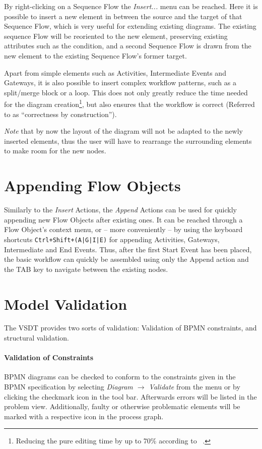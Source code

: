 By right-clicking on a Sequence Flow the \emph{Insert...} menu can be reached.  Here it is possible to insert a new element in between the source and the target of that Sequence Flow, which is very useful for extending existing diagrams.  The existing sequence Flow will be reoriented to the new element, preserving existing attributes such as the condition, and a second Sequence Flow is drawn from the new element to the existing Sequence Flow's former target.

Apart from simple elements such as Activities, Intermediate Events and Gateways, it is also possible to insert complex workflow patterns, such as a split/merge block or a loop.  This does not only greatly reduce the time needed for the diagram creation\footnote{Reducing the pure editing time by up to 70\% according to ~\cite{gschwind2008applying}.}, but also ensures that the workflow is correct (Referred to as ``correctness by construction'').

\emph{Note} that by now the layout of the diagram will not be adapted to the newly inserted elements, thus the user will have to rearrange the surrounding elements to make room for the new nodes.

\section{Appending Flow Objects}
Similarly to the \emph{Insert} Actions, the \emph{Append} Actions can be used for quickly appending new Flow Objects after existing ones.  It can be reached through a Flow Object's context menu, or -- more conveniently -- by using the keyboard shortcuts \texttt{Ctrl+Shift+(A|G|I|E)} for appending Activities, Gateways, Intermediate and End Events.  Thus, after the first Start Event has been placed, the basic workflow can quickly be assembled using only the Append action and the TAB key to navigate between the existing nodes.


\section{Model Validation}
\label{sec:user_features_validate}

The VSDT provides two sorts of validation:  Validation of BPMN constraints, and structural validation.

\paragraph{Validation of Constraints}
BPMN diagrams can be checked to conform to the constraints given in the BPMN specification by selecting \emph{Diagram $\rightarrow$ Validate} from the menu or by clicking the checkmark icon in the tool bar.  Afterwards errors will be listed in the problem view.  Additionally, faulty or otherwise problematic elements will be marked with a respective icon in the process graph.

